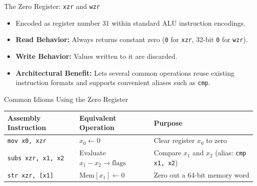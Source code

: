 \documentclass[aspectratio=169,11pt,t,xcolor=table]{beamer}
\newcommand{\key}[1]{\textbf{#1}}
\newcommand{\bits}[1]{\texttt{#1}}
\newcommand{\code}[1]{\texttt{#1}}
\begin{document}
\begin{frame}{The Zero Register: \texttt{xzr} and \texttt{wzr}}
\vfill
\begin{itemize}\setlength{\itemsep}{4pt}
  \item Encoded as register number 31 within standard ALU instruction encodings.
  \item \key{Read Behavior:} Always returns constant zero (\bits{0} for \bits{xzr}, 32-bit \bits{0} for \bits{wzr}).
  \item \key{Write Behavior:} Values written to it are discarded.
  \item \key{Architectural Benefit:} Lets several common operations reuse existing instruction formats and supports convenient aliases such as \code{cmp}.
\end{itemize}

\vfill
\begin{block}{Common Idioms Using the Zero Register}
\small
\begin{tabular}{lll}
\toprule
\textbf{Assembly Instruction} & \textbf{Equivalent Operation} & \textbf{Purpose} \\
\midrule
\rowcolor{tablerow}
\code{mov x0, xzr}            & $x_0 \leftarrow 0$            & Clear register $x_0$ to zero \\
\code{subs xzr, x1, x2}       & Evaluate $x_1 - x_2 \to \text{flags}$ & Compare $x_1$ and $x_2$ (alias: \code{cmp x1, x2}) \\
\rowcolor{tablerow}
\code{str xzr, [x1]}          & $\text{Mem}[x_1] \leftarrow 0$ & Zero out a 64-bit memory word \\
\bottomrule
\end{tabular}
\end{block}
\vfill
\end{frame}









\end{document}
